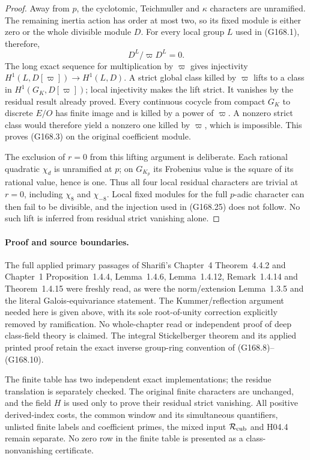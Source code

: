 \begin{proof}
Away from $p$, the cyclotomic, Teichmuller and $\kappa$
characters are unramified.  The remaining inertia action
has order at most two, so its fixed module is either zero
or the whole divisible module $D$.
For every local group $L$ used in (G168.1), therefore,
\[
                         D^L/\varpi D^L=0.
 \tag{G168.25}
\]
The long exact sequence for multiplication by $\varpi$
gives injectivity $H^1(L,D[\varpi])\to H^1(L,D)$.
A strict global class killed by $\varpi$ lifts to a class
in $H^1(G_K,D[\varpi])$; local injectivity makes the lift
strict.  It vanishes by the residual result already proved.
Every continuous cocycle from compact $G_K$ to discrete
$E/O$ has finite image and is killed by a power of $\varpi$.
A nonzero strict class would therefore yield a nonzero
one killed by $\varpi$, which is impossible.
This proves (G168.3) on the original coefficient module.

The exclusion of $r=0$ from this lifting argument is deliberate.
Each rational quadratic $\chi_d$ is unramified at $p$;
on $G_{K_p}$ its Frobenius value is the square of its
rational value, hence is one.
Thus all four local residual characters are trivial at
$r=0$, including $\chi_8$ and $\chi_{-8}$.
Local fixed modules for the full $p$-adic character can then
fail to be divisible, and the injection used in (G168.25)
does not follow.  No such lift is inferred from residual
strict vanishing alone.
\end{proof}

\paragraph{Proof and source boundaries.}
The full applied primary passages of Sharifi's Chapter~4
Theorem~4.4.2 and Chapter~1 Proposition~1.4.4,
Lemma~1.4.6, Lemma~1.4.12, Remark~1.4.14 and
Theorem~1.4.15 were freshly read, as were the norm/extension
Lemma~1.3.5 and the literal Galois-equivariance statement.
The Kummer/reflection argument needed here is given above,
with its sole root-of-unity correction explicitly removed
by ramification.  No whole-chapter read or independent proof
of deep class-field theory is claimed.
The integral Stickelberger theorem and its applied printed
proof retain the exact inverse group-ring convention of
(G168.8)--(G168.10).

The finite table has two independent exact implementations;
the residue translation is separately checked.
The original finite characters are unchanged, and the field
$H$ is used only to prove their residual strict vanishing.
All positive derived-index costs, the common window and its
simultaneous quantifiers, unlisted finite labels and coefficient
primes, the mixed input $\mathcal R_{\rm cub}$ and H04.4
remain separate.  No zero row in the finite table is presented
as a class-nonvanishing certificate.
